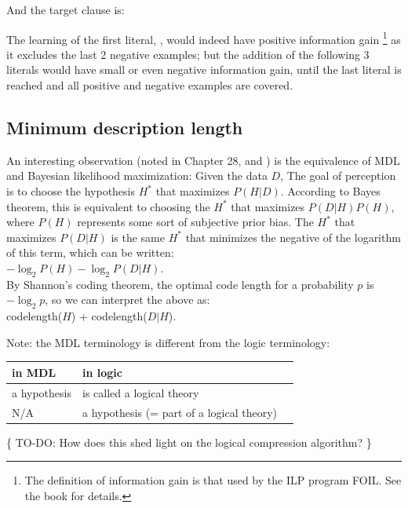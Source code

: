 And the target clause is:\\
\hspace*{1cm} 

The learning of the first literal, , would indeed have positive information gain
\footnote{The definition of information gain is that used by the ILP program FOIL.  See the book for details.}
 as it excludes the last 2 negative examples;  but the addition of the following 3 literals would have small or even negative information gain, until the last literal is reached and all positive and negative examples are covered.

\subsection{Minimum description length}

An interesting observation (noted in \citep*{MacKay2003} Chapter 28, and \citep*{Chater2005}) is the equivalence of MDL and Bayesian likelihood maximization:  Given the data $D$, The goal of perception is to choose the hypothesis $H^*$ that maximizes $P(H|D)$.  According to Bayes theorem, this is equivalent to choosing the $H^*$ that maximizes $P(D|H)P(H)$, where $P(H)$ represents some sort of subjective prior bias.  The $H^*$ that maximizes $P(D|H)$ is the same $H^*$ that minimizes the negative of the logarithm of this term, which can be written:\\
\hspace*{1cm} $-\log_2 P(H) - \log_2 P(D|H)$.\\
By Shannon's coding theorem, the optimal code length for a probability $p$ is $-\log_2 p$, so we can interpret the above as:\\
\hspace*{1cm} codelength($H$) + codelength($D|H$).

Note:  the MDL terminology is different from the logic terminology:\\
\hspace*{1cm} \begin{tabular}{l l l}
\textbf{in MDL}       & \textbf{in logic}\\
\hline
a hypothesis          & is called a logical theory\\
N/A                   & a hypothesis (= part of a logical theory)
\end{tabular}

\{ TO-DO:  How does this shed light on the logical compression algorithm? \}


